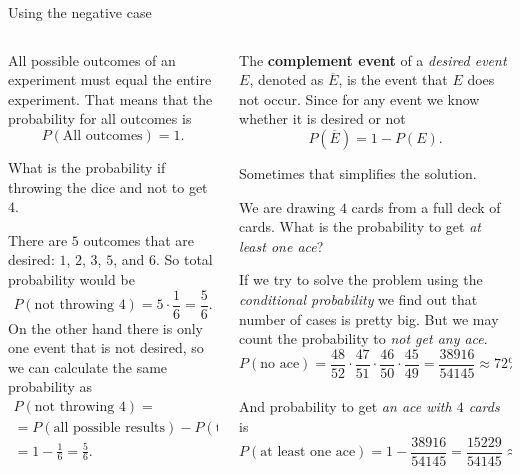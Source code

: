 \documentclass[9pt,aspectratio=169]{beamer}
\begin{document}
\begin{frame}{Using the negative case}
  \begin{columns}[T]
    \begin{column}{0.5\textwidth}
      All possible outcomes of an experiment must equal the entire experiment.  That means that the probability for all outcomes is
      \[ P(\text{All outcomes}) = 1. \]
      \vspace*{-1em}
      \begin{problem}
        What is the probability if throwing the dice and not to get $4$. 
      \end{problem}
      There are $5$ outcomes that are desired: $1$, $2$, $3$, $5$, and $6$. So total probability would be 
      \[ P(\text{not throwing $4$}) = 5 \cdot \frac{1}{6} = \frac{5}{6}. \]
      On the other hand there is only one event that is not desired, so we can calculate the same probability as
      \begin{multline*} 
        P(\text{not throwing $4$}) = \\
        = P(\text{all possible results}) - P(\text{throwing $4$}) = \\
        = 1 - \frac{1}{6} = \frac{5}{6}.
      \end{multline*}
    \end{column}
    \begin{column}{0.5\textwidth}
      \begin{definition}
        The \textbf{complement event} of a \emph{desired event $E$}, denoted as $\overline{E}$, is the event that $E$ does not occur. Since for any event we know whether it is desired or not
        \[ P(\overline{E}) = 1 - P(E). \]
        \vspace*{-2.5ex} 
      \end{definition}
      Sometimes that simplifies the solution.
      \begin{problem}
        We are drawing $4$ cards from a full deck of cards. What is the probability to get \emph{at least one ace}?
      \end{problem}
      If we try to solve the problem using the \emph{conditional probability} we find out that number of cases is pretty big. But we may count the probability to \emph{not get any ace}.
      \[ P (\text{no ace}) = \frac{48}{52} \cdot \frac{47}{51} \cdot \frac{46}{50} \cdot \frac{45}{49} = \frac{38916}{54145} \approx 72\%.\]\\[-1ex]
      And probability to get \emph{an ace with $4$ cards} is
      \[ P (\text{at least one ace}) = 1 - \frac{38916}{54145} = \frac{15229}{54145} \approx 28 \%. \]
    \end{column}
  \end{columns}
\end{frame}
\end{document}
